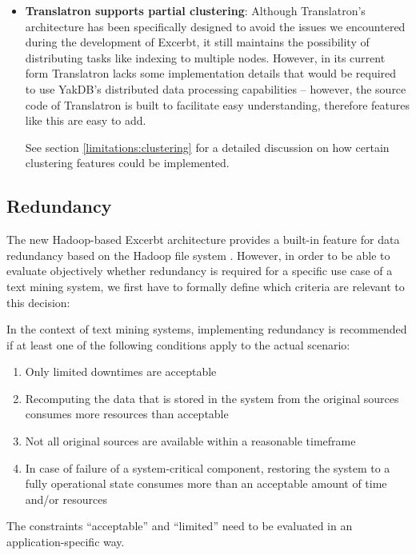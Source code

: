 \documentclass[a4paper, 12pt, twoside, reqn]{report}
\numberwithin{figure}{chapter}
\newtheorem[L]{boxedDefinition}{Definition}
\newtheorem[L]{boxedExample}{Example}
\begin{document}
\begin{itemize}
 Moreover, the patent \cite{das2006method} seems to encompass the autodiscovery method used in ElasticSearch. In order to avoid legal issues for all possible use cases of Translatron, using this method appears to be impossible without qualified legal advice which is not available at the time of writing this thesis\footnote{}.
 
 \item \textbf{Translatron supports partial clustering}: Although Translatron's architecture has been specifically designed to avoid the issues we encountered during the development of Excerbt, it still maintains the possibility of distributing tasks like indexing to multiple nodes. However, in its current form Translatron lacks some implementation details that would be required to use YakDB's distributed data processing capabilities -- however, the source code of Translatron is built to facilitate easy understanding, therefore features like this are easy to add.
 
 See section \ref{limitations:clustering} for a detailed discussion on how certain clustering features could be implemented.
\end{itemize}

\newpage
\subsection{Redundancy}\label{ssec:redundancy}

The new Hadoop-based Excerbt architecture provides a built-in feature for data redundancy based on the Hadoop file system \cite[section 4.1 \& 4.5]{wachinger2013next}. However, in order to be able to evaluate objectively whether redundancy is required for a specific use case of a text mining system, we first have to formally define which criteria are relevant to this decision:

\begin{samepage}
\begin{boxedDefinition}\label{def:redundancy-criteria}
In the context of text mining systems, implementing redundancy is recommended if at least one of the following conditions apply to the actual scenario:
  \begin{enumerate}[label={(\arabic*)}]
   \item Only limited downtimes are acceptable
   \item Recomputing the data that is stored in the system from the original sources consumes more resources than acceptable
   \item Not all original sources are available within a reasonable timeframe
   \item In case of failure of a system-critical component, restoring the system to a fully operational state consumes more than an acceptable amount of time and/or resources
  \end{enumerate}
  {\setlength{\parindent}{0cm} The constraints ``acceptable'' and ``limited'' need to be evaluated in an application-specific way.}
\end{boxedDefinition}
 \end{samepage}
\end{document}
